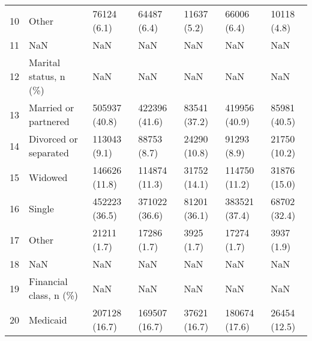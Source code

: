 \begin{tabular}{lllllll}
10 &                                              Other &        76124 (6.1) &                   64487 (6.4) &               11637 (5.2) &                    66006 (6.4) &               10118 (4.8) \\
11 &                                                NaN &                NaN &                           NaN &                       NaN &                            NaN &                       NaN \\
12 &                              Marital status, n (\%) &                NaN &                           NaN &                       NaN &                            NaN &                       NaN \\
13 &                               Married or partnered &      505937 (40.8) &                 422396 (41.6) &              83541 (37.2) &                  419956 (40.9) &              85981 (40.5) \\
14 &                              Divorced or separated &       113043 (9.1) &                   88753 (8.7) &              24290 (10.8) &                    91293 (8.9) &              21750 (10.2) \\
15 &                                            Widowed &      146626 (11.8) &                 114874 (11.3) &              31752 (14.1) &                  114750 (11.2) &              31876 (15.0) \\
16 &                                             Single &      452223 (36.5) &                 371022 (36.6) &              81201 (36.1) &                  383521 (37.4) &              68702 (32.4) \\
17 &                                              Other &        21211 (1.7) &                   17286 (1.7) &                3925 (1.7) &                    17274 (1.7) &                3937 (1.9) \\
18 &                                                NaN &                NaN &                           NaN &                       NaN &                            NaN &                       NaN \\
19 &                             Financial class, n (\%) &                NaN &                           NaN &                       NaN &                            NaN &                       NaN \\
20 &                                           Medicaid &      207128 (16.7) &                 169507 (16.7) &              37621 (16.7) &                  180674 (17.6) &              26454 (12.5) \\

\end{tabular}
